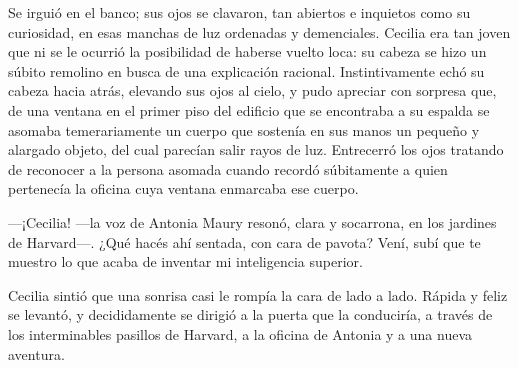 Se irguió en el banco; sus ojos se clavaron, tan abiertos e inquietos
como su curiosidad, en esas manchas de luz ordenadas y
demenciales. Cecilia era tan joven que ni se le ocurrió la posibilidad
de haberse vuelto loca: su cabeza se hizo un súbito remolino en busca
de una explicación racional. Instintivamente echó su cabeza hacia
atrás, elevando sus ojos al cielo, y pudo apreciar con sorpresa que,
de una ventana en el primer piso del edificio que se encontraba a su
espalda se asomaba temerariamente un cuerpo que sostenía en sus manos
un pequeño y alargado objeto, del cual parecían salir rayos de
luz. Entrecerró los ojos tratando de reconocer a la persona asomada
cuando recordó súbitamente a quien pertenecía la oficina cuya ventana
enmarcaba ese cuerpo.

---¡Cecilia! ---la voz de Antonia Maury resonó, clara y socarrona, en
los jardines de Harvard---. ¿Qué hacés ahí sentada, con cara de
pavota?  Vení, subí que te muestro lo que acaba de inventar mi
inteligencia superior.

Cecilia sintió que una sonrisa casi le rompía la cara de lado a
lado. Rápida y feliz se levantó, y decididamente se dirigió a la
puerta que la conduciría, a través de los interminables pasillos de
Harvard, a la oficina de Antonia y a una nueva aventura.



